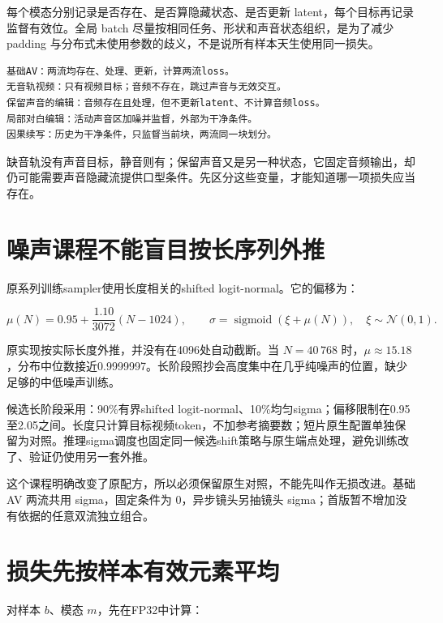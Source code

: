每个模态分别记录是否存在、是否算隐藏状态、是否更新 latent，每个目标再记录监督有效位。全局 batch 尽量按相同任务、形状和声音状态组织，是为了减少 padding 与分布式未使用参数的歧义，不是说所有样本天生使用同一损失。

\begin{verbatim}
基础AV：两流均存在、处理、更新，计算两流loss。
无音轨视频：只有视频目标；音频不存在，跳过声音与无效交互。
保留声音的编辑：音频存在且处理，但不更新latent、不计算音频loss。
局部对白编辑：活动声音区加噪并监督，外部为干净条件。
因果续写：历史为干净条件，只监督当前块，两流同一块划分。
\end{verbatim}

缺音轨没有声音目标，静音则有；保留声音又是另一种状态，它固定音频输出，却仍可能需要声音隐藏流提供口型条件。先区分这些变量，才能知道哪一项损失应当存在。

\section{噪声课程不能盲目按长序列外推}\label{seedance-m25-ux566aux58f0ux8bfeux7a0bux4e0dux80fdux76f2ux76eeux6309ux957fux5e8fux5217ux5916ux63a8}

原系列训练sampler使用长度相关的shifted logit-normal。它的偏移为：

\[
\mu(N)=0.95+\frac{1.10}{3072}(N-1024),
\qquad \sigma=\operatorname{sigmoid}(\xi+\mu(N)),\quad
\xi\sim\mathcal N(0,1).
\]

原实现按实际长度外推，并没有在4096处自动截断。当 \(N=40\,768\) 时，\(\mu\approx15.18\)，分布中位数接近0.9999997。长阶段照抄会高度集中在几乎纯噪声的位置，缺少足够的中低噪声训练。

候选长阶段采用：90\%有界shifted logit-normal、10\%均匀sigma；偏移限制在0.95至2.05之间。长度只计算目标视频token，不加参考摘要数；短片原生配置单独保留为对照。推理sigma调度也固定同一候选shift策略与原生端点处理，避免训练改了、验证仍使用另一套外推。

这个课程明确改变了原配方，所以必须保留原生对照，不能先叫作无损改进。基础 AV 两流共用 sigma，固定条件为 0，异步镜头另抽镜头 sigma；首版暂不增加没有依据的任意双流独立组合。

\section{损失先按样本有效元素平均}\label{seedance-m25-ux635fux5931ux5148ux6309ux6837ux672cux6709ux6548ux5143ux7d20ux5e73ux5747}

对样本 \(b\)、模态 \(m\)，先在FP32中计算：

